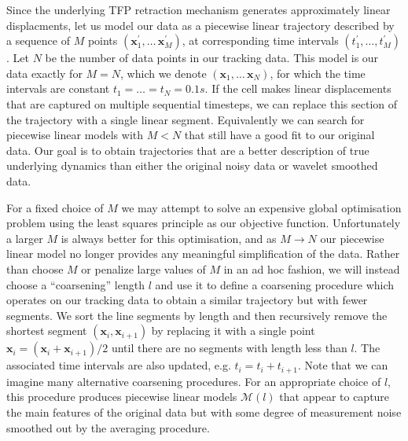 \documentclass{article}
\newcommand{\vct}[1]{\bm{#1}} %
\begin{document}
Since the underlying TFP retraction mechanism generates approximately linear displacments, 
let us model our data as a piecewise linear trajectory described by a sequence of $M$ points $\left( \vct{x}_1^\prime,\ldots\,\vct{x}_M^\prime \right)$,
at corresponding time intervals $\left( t_1^\prime, \ldots, t_M^\prime \right)$. Let $N$ be the number of data points
in our tracking data.
This model is our data exactly for $M = N$, which we denote $\left( \vct{x}_1,\ldots\,\vct{x}_N \right)$,
for which the time intervals are constant $t_1 = \ldots = t_N = 0.1s$. 
If the cell makes linear displacements that are captured on multiple sequential timesteps,
we can replace this section of the trajectory with a single linear segment.
Equivalently we can search for piecewise linear models
with $M < N$ that still have a good fit to our original data.
Our goal is to obtain trajectories that are a better description of true underlying dynamics
than either the original noisy data or wavelet smoothed data.

For a fixed choice of $M$ we may attempt to solve an expensive global optimisation problem
using the least squares principle as our objective function.
Unfortunately a larger $M$ is always better for this optimisation,
and as $M\rightarrow N$ our piecewise linear model no longer provides any meaningful simplification of the data.
Rather than choose $M$ or penalize large values of $M$ in an ad hoc fashion, 
we will instead choose a ``coarsening'' length $l$ and use it to define a coarsening
procedure which operates on our tracking data to obtain a similar trajectory but with fewer segments. 
We sort the line segments by length and then
recursively remove the shortest segment $(\vct{x}_i,\vct{x}_{i+1})$ by 
replacing it with a single point $\vct{x}_i = (\vct{x}_i + \vct{x}_{i+1})/2$ until there are no segments 
with length less than $l$. The associated time intervals are also updated, e.g.  $t_i = t_i + t_{i+1}$.
Note that we can imagine many alternative coarsening procedures.
 For an appropriate choice of $l$, this procedure produces
piecewise linear models $\mathcal{M}(l)$ that appear to capture the main features of the original data but with
some degree of measurement noise smoothed out by the averaging procedure.
\end{document}
